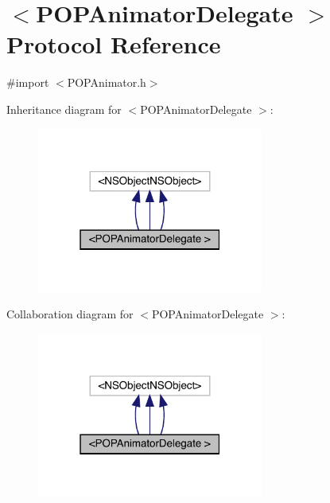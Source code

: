 \hypertarget{protocol_p_o_p_animator_delegate_01-p}{}\section{$<$P\+O\+P\+Animator\+Delegate $>$ Protocol Reference}
\label{protocol_p_o_p_animator_delegate_01-p}


{\ttfamily \#import $<$P\+O\+P\+Animator.\+h$>$}



Inheritance diagram for $<$P\+O\+P\+Animator\+Delegate $>$\+:\nopagebreak
\begin{figure}[H]
\begin{center}
\leavevmode
\includegraphics[width=211pt]{protocol_p_o_p_animator_delegate_01-p__inherit__graph}
\end{center}
\end{figure}


Collaboration diagram for $<$P\+O\+P\+Animator\+Delegate $>$\+:\nopagebreak
\begin{figure}[H]
\begin{center}
\leavevmode
\includegraphics[width=211pt]{protocol_p_o_p_animator_delegate_01-p__coll__graph}
\end{center}
\end{figure}
